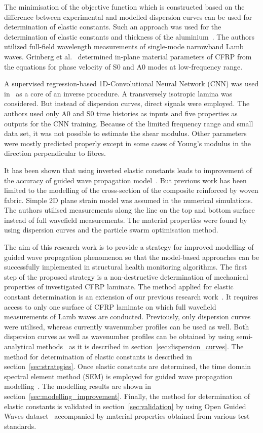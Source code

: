 \documentclass[preprint,12pt]{elsarticle}
\begin{document}
The minimisation of the objective function which is constructed based on the difference between experimental and modelled dispersion curves can be used for determination of elastic constants.
Such an approach was used for the determination of elastic constants and thickness of the aluminium~\cite{Dean2008}.
The authors utilized full-field wavelength measurements of single-mode narrowband Lamb waves. Grinberg et al.~\cite{Grimberg2010} determined in-plane material parameters of CFRP from the equations for phase velocity of S0 and A0 modes at low-frequency range.

A supervised regression-based 1D-Convolutional Neural Network (CNN) was used in~\cite{Rautela2020} as a core of an inverse procedure.
A transversely isotropic lamina was considered. 
But instead of dispersion curves, direct signals were employed.
The authors used only A0 and S0 time histories as inputs and five properties as outputs for the CNN training.
Because of the limited frequency range and small data set, it was not possible to estimate the shear modulus. 
Other parameters were mostly predicted properly except in some cases of Young's modulus in the direction perpendicular to fibres.

It has been shown that using inverted elastic constants leads to improvement of the accuracy of guided wave propagation model~\cite{Ong2016}.
But previous work has been limited to the modelling of the cross-section of the composite reinforced by woven fabric.
Simple 2D plane strain model was assumed in the numerical simulations.
The authors utilised measurements along the line on the top and bottom surface instead of full wavefield measurements.
The material properties were found by using dispersion curves and the particle swarm optimisation method.

The aim of this research work is to provide a strategy for improved modelling of guided wave propagation phenomenon so that the model-based approaches can be successfully implemented in structural health monitoring algorithms.
The first step of the proposed strategy is a non-destructive determination of mechanical properties of investigated CFRP laminate.
The method applied for elastic constant determination is an extension of our previous research work~\cite{Kudela2020}.	
It requires access to only one surface of CFRP laminate on which full wavefield measurements of Lamb waves are conducted.
Previously, only dispersion curves were utilised, whereas currently wavenumber profiles can be used as well.
Both dispersion curves as well as wavenumber profiles can be obtained by using semi-analytical methods~\cite{Bartoli2006,Marzani2008} as it is described in section~\ref{sec:dispersion_curves}.
The method for determination of elastic constants is described in section~\ref{sec:strategies}.
Once elastic constants are determined, the time domain spectral element method (SEM) is employed for guided wave propagation modelling~\cite{Kudela2020a}.
The modelling results are shown in section~\ref{sec:modelling_improvement}.
Finally, the method for determination of elastic constants is validated in section~\ref{sec:validation} by using Open Guided Waves dataset~\cite{Moll2019} accompanied by material properties obtained from various test standards.
	
\end{document}
